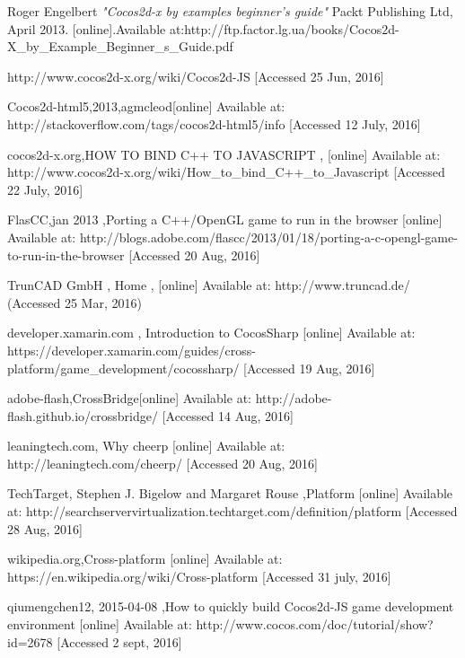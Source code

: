 \documentclass[23pt]{article}
\begin{document}
\begin{thebibliography}{9}

 Roger Engelbert
\textit{"Cocos2d-x by examples beginner’s guide"}
 Packt Publishing Ltd, April 2013.
{[online].Available at:http://ftp.factor.lg.ua/books/Cocos2d-X\_by\_Example\_Beginner\_s\_Guide.pdf}

{http://www.cocos2d-x.org/wiki/Cocos2d-JS} [Accessed 25 Jun, 2016]


Cocos2d-html5,2013,agmcleod[online] Available at:
{http://stackoverflow.com/tags/cocos2d-html5/info} [Accessed 12 July, 2016]


cocos2d-x.org,HOW TO BIND C++ TO JAVASCRIPT , [online] Available at:
{http://www.cocos2d-x.org/wiki/How\_to\_bind\_C++\_to\_Javascript}  [Accessed 22 July, 2016]

FlasCC,jan 2013 ,Porting a C++/OpenGL game to run in the browser [online] Available at:
{http://blogs.adobe.com/flascc/2013/01/18/porting-a-c-opengl-game-to-run-in-the-browser} [Accessed 20 Aug, 2016]

TrunCAD GmbH , Home , [online] Available at:
{http://www.truncad.de/ (Accessed 25 Mar, 2016) }

developer.xamarin.com , Introduction to CocosSharp [online] Available at:
{https://developer.xamarin.com/guides/cross-platform/game\_development/cocossharp/} [Accessed 19 Aug, 2016]


adobe-flash,CrossBridge[online] Available at:
{http://adobe-flash.github.io/crossbridge/}  [Accessed 14 Aug, 2016]


leaningtech.com, Why cheerp [online] Available at:
{http://leaningtech.com/cheerp/}   [Accessed 20 Aug, 2016]

TechTarget, Stephen J. Bigelow and Margaret Rouse ,Platform [online] Available at:
{http://searchservervirtualization.techtarget.com/definition/platform}  [Accessed 28 Aug, 2016]


wikipedia.org,Cross-platform [online] Available at:
{https://en.wikipedia.org/wiki/Cross-platform}   [Accessed 31 july, 2016]

qiumengchen12, 2015-04-08 ,How to quickly build Cocos2d-JS game development environment [online] Available at:
{http://www.cocos.com/doc/tutorial/show?id=2678}    [Accessed 2 sept, 2016]


\end{thebibliography}
\end{document}
